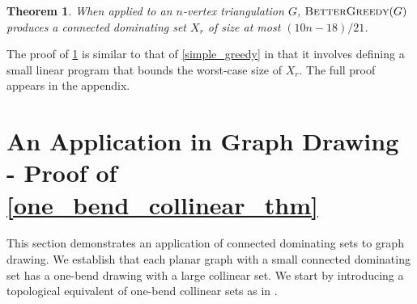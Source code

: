 \documentclass[a4paper,UKenglish,cleveref, autoref, thm-restate]{lipics-v2021}
\newtheorem{thm}{Theorem}
\begin{document}
\begin{thm}\label{better_greedy}
  When applied to an $n$-vertex triangulation $G$,  $\textsc{BetterGreedy}(G)$ produces a connected dominating set $X_r$ of size at most $(10n-18)/21$.
\end{thm}

The proof of \cref{better_greedy} is similar to that of \cref{simple_greedy} in that it involves defining a small linear program that bounds the worst-case size of $X_r$. The full proof appears in the appendix.


\section{An Application in Graph Drawing - Proof of \cref{one_bend_collinear_thm}}
\label{one_bend}
This section demonstrates an application of connected dominating sets to graph drawing. We establish that each planar graph with a small connected dominating set has a one-bend drawing with a large collinear set. We start by introducing a topological equivalent of one-bend collinear sets as in \cite{DBLP:journals/jocg/LozzoDFMR18}.



\end{document}
